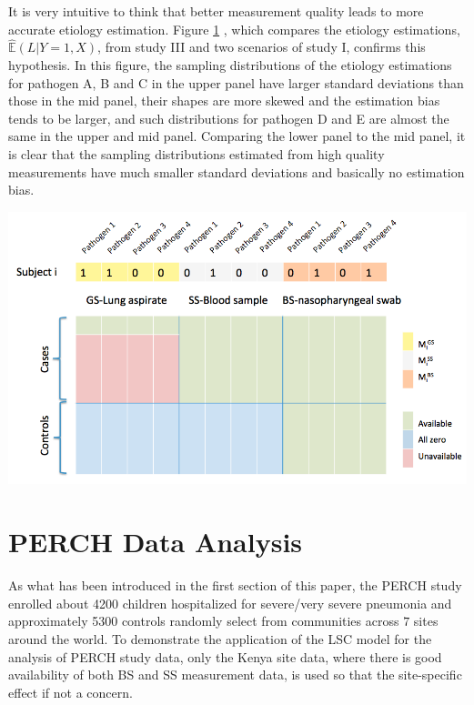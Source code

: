 \documentclass[11 pt, a4paper]{article}  %
\begin{document}
It is very intuitive to think that better measurement quality leads to more accurate etiology estimation. Figure \ref{} , which compares the etiology estimations, $\hat{\mathbb{E}}(L|Y=1,X)$, from study III and two scenarios of study I, confirms this hypothesis. In this figure, the sampling distributions of the etiology estimations for pathogen A, B and C in the upper panel have larger standard deviations than those in the mid panel, their shapes are more skewed and the estimation bias tends to be larger, and such distributions for pathogen D and E are almost the same in the upper and mid panel. Comparing the lower panel to the mid panel, it is clear that the sampling distributions estimated from high quality measurements have much smaller standard deviations and basically no estimation bias.\\


\begin{center}
\includegraphics[scale=0.45]{DataDescription.png}
\label{data}
\end{center}


\section{PERCH Data Analysis}
As what has been introduced in the first section of this paper, the PERCH study enrolled about 4200 children hospitalized for severe/very severe pneumonia and approximately 5300 controls randomly select from communities across $7$ sites around the world. To demonstrate the application of the LSC model for the analysis of PERCH study data, only the Kenya site data, where there is good availability of both BS and SS measurement data, is used so that the site-specific effect if not a concern. 
\end{document}
